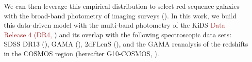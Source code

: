 \documentclass{aa}
\numberwithin{equation}{section}
\newcommand{\mb}{\textcolor{brown}}
\begin{document}
We can then leverage this empirical distribution to select red-sequence galaxies with the broad-band photometry of imaging surveys (\citealt{gladders_yee2000,hao2009,redmap_sdss,rozo2016,elvin2017,oguri2018,vakili2019}). In this work, we build this data-driven model with the multi-band photometry of the KiDS \mb{Data Release 4 (DR4,} \citealt{kuijken2019}) and its overlap with the following spectroscopic data sets: SDSS DR13 (\citealt{sdss_dr13}), GAMA (\citealt{driver2011}), 2dFLenS (\citealt{blake2016}), and the GAMA reanalysis of the redshifts in the COSMOS region (hereafter G10-COSMOS, \citealt{davis2015}). 

\end{document}
